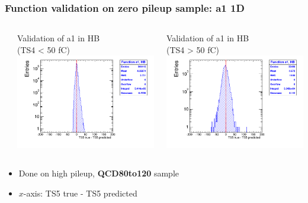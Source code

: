 \documentclass[bigger]{beamer}
\providecommand{\alert}[1]{\textbf{#1}}
\begin{document}
\begin{frame}
\frametitle{Function validation on zero pileup sample: a1 1D}
\label{sec-3-2-8}
\begin{columns} %
\label{sec-3-2-8-1}
\begin{column}{0.55\textwidth}
\label{sec-3-2-8-1-1}

\centering
Validation of a1 in HB \\ (TS4 < 50 fC)
\includegraphics[width=\textwidth]{fig/crosscheck_1D_sample80to120_a1_under50_ring0.png}
\end{column}
\begin{column}{0.55\textwidth}
\label{sec-3-2-8-1-2}

\centering
Validation of a1 in HB \\ (TS4 > 50 fC)
\includegraphics[width=\textwidth]{fig/crosscheck_1D_sample80to120_a1_over50_ring0.png}
\end{column}
\end{columns}
\label{sec-3-2-8-2}
\begin{itemize}

\item Done on high pileup, \alert{QCD80to120} sample
\label{sec-3-2-8-2-1}%

\item $x$-axis: TS5 true - TS5 predicted
\label{sec-3-2-8-2-2}%
\end{itemize} %
\end{frame}
\end{document}
